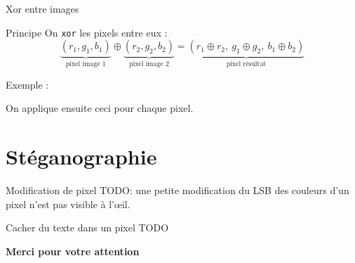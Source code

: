 \documentclass{beamer}
\begin{document}
    \begin{frame}{Xor entre images}%
        \begin{block}{Principe}%
            On \texttt{xor} les pixels entre eux :
            \[
                \underbrace{(r_1, g_1, b_1)}_{\text{pixel image 1}}
                \oplus
                \underbrace{(r_2, g_2, b_2)}_{\text{pixel image 2}}
                =
                \underbrace{(r_1 \oplus r_2,\ g_1 \oplus g_2,\ b_1 \oplus b_2)}_{\text{pixel résultat}}
            \]
        \end{block}%

        \begin{block}{Exemple :}%
            \begin{center}
            \end{center}
        \end{block}%

        On applique ensuite ceci pour chaque pixel.
    \end{frame}%

    \section{Stéganographie}

    \begin{frame}{Modification de pixel}%
        TODO: une petite modification du LSB des couleurs d'un pixel n'est pas visible à l'\oe il.
    \end{frame}%

    \begin{frame}{Cacher du texte dans un pixel}
        TODO
    \end{frame}

    \begin{frame}%
        \begin{center}
            \large{\bf Merci pour votre attention}
        \end{center}
    \end{frame}%
    
\end{document}
